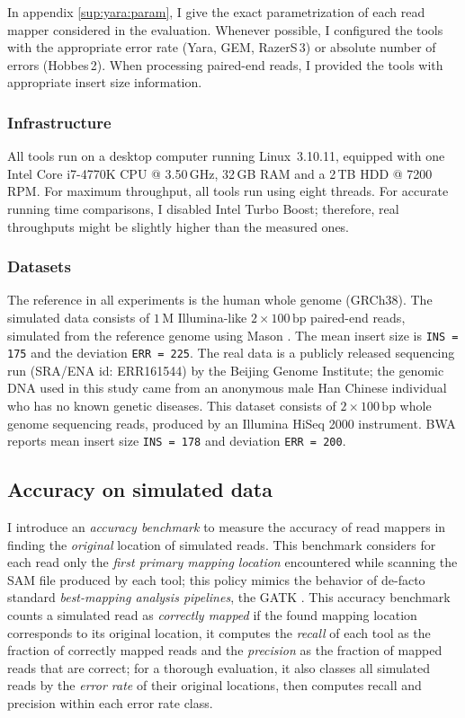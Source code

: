 In appendix \ref{sup:yara:param}, I give the exact parametrization of each read mapper considered in the evaluation.
Whenever possible, I configured the tools with the appropriate error rate (Yara, GEM, RazerS\,3) or absolute number of errors (Hobbes\,2).
When processing paired-end reads, I provided the tools with appropriate insert size information.

\subsubsection{Infrastructure}

All tools run on a desktop computer running Linux~3.10.11, equipped with one Intel\textsuperscript{\textregistered} Core i7-4770K CPU @ 3.50\,GHz, 32\,GB RAM and a 2\,TB HDD @ 7200\,RPM.
For maximum throughput, all tools run using eight threads.
For accurate running time comparisons, I disabled Intel Turbo Boost; therefore, real throughputs might be slightly higher than the measured ones.

\subsubsection{Datasets}

The reference in all experiments is the human whole genome (GRCh38).
The simulated data consists of $1\,\text{M}$ Illumina-like $2 \times 100\,\text{bp}$ paired-end reads, simulated from the reference genome using Mason \citep{Holtgrewe2010}.
The mean insert size is \texttt{INS = 175} and the deviation \texttt{ERR = 225}.
The real data is a publicly released sequencing run (SRA/ENA id: ERR161544) by the Beijing Genome Institute;
the genomic DNA used in this study came from an anonymous male Han Chinese individual who has no known genetic diseases.
This dataset consists of $2 \times 100\,\text{bp}$ whole genome sequencing reads, produced by an Illumina HiSeq 2000 instrument.
BWA reports mean insert size \texttt{INS = 178} and deviation \texttt{ERR = 200}.

\subsection{Accuracy on simulated data}

I introduce an \emph{accuracy benchmark} to measure the accuracy of read mappers in finding the \emph{original} location of simulated reads.
This benchmark considers for each read only the \emph{first primary mapping location} encountered while scanning the SAM file \citep{Li2009a} produced by each tool;
this policy mimics the behavior of de-facto standard \emph{best-mapping analysis pipelines}, \eg the GATK \citep{DePristo2011}.
This accuracy benchmark counts a simulated read as \emph{correctly mapped} if the found mapping location corresponds to its original location,
it computes the \emph{recall} of each tool as the fraction of correctly mapped reads and the \emph{precision} as the fraction of mapped reads that are correct;
for a thorough evaluation, it also classes all simulated reads by the \emph{error rate} of their original locations, then computes recall and precision within each error rate class.

